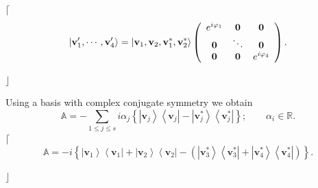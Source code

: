\documentclass[aps,preprint]{revtex4}%
\begin{document}
$\lceil$%
\begin{equation}
\left\vert \mathbf{v}_{1}^{\prime},\cdots,\mathbf{v}_{4}^{\prime}\right\rangle
=\left\vert \mathbf{v}_{1},\mathbf{v}_{2},\mathbf{v}_{1}^{\ast},\mathbf{v}%
_{2}^{\ast}\right\rangle \left(
\begin{array}
[c]{ccc}%
e^{i\varphi_{1}} & \mathbf{0} & \mathbf{0}\\
\mathbf{0} & \ddots & \mathbf{0}\\
\mathbf{0} & \mathbf{0} & e^{i\varphi_{4}}%
\end{array}
\right)  .
\end{equation}


$\rfloor$

Using a basis with complex conjugate symmetry we obtain
\begin{equation}
\mathbb{A}=-\sum_{1\leq j\leq s}i\alpha_{j}\left\{  \left\vert \mathbf{v}%
_{j}\right\rangle \left\langle \mathbf{v}_{j}\right\vert -\left\vert
\mathbf{v}_{j}^{\ast}\right\rangle \left\langle \mathbf{v}_{j}^{\ast
}\right\vert \right\}  ;\qquad\alpha_{i}\in\mathbb{R}.
\end{equation}
$\lceil$%
\begin{equation}
\mathbb{A}=-i\left\{  \left\vert \mathbf{v}_{1}\right\rangle \left\langle
\mathbf{v}_{1}\right\vert +\left\vert \mathbf{v}_{2}\right\rangle \left\langle
\mathbf{v}_{2}\right\vert -\left(  \left\vert \mathbf{v}_{3}^{\ast
}\right\rangle \left\langle \mathbf{v}_{3}^{\ast}\right\vert +\left\vert
\mathbf{v}_{4}^{\ast}\right\rangle \left\langle \mathbf{v}_{4}^{\ast
}\right\vert \right)  \right\}  .
\end{equation}


$\rfloor$
\end{document}
